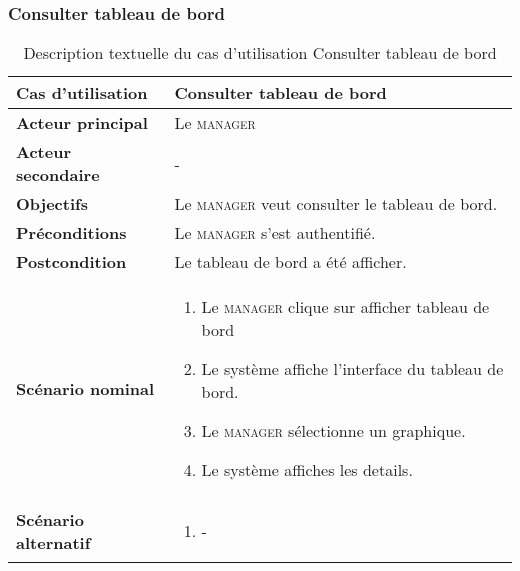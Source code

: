         \subsubsection[Consulter tableau de bord]{Consulter tableau de bord}
        \begin{longtable}{p{4cm} p{9cm}}
            \caption{Description textuelle du cas d’utilisation Consulter tableau de bord}
            \label{table:usecaseConsDash}
            \\\hline\hline
                \textbf{Cas d’utilisation} & \textbf{Consulter tableau de bord}
            \\\hline\hline
                    \textbf{Acteur principal} & Le \textsc{manager}
                \\
                    \textbf{Acteur secondaire} & -
                \\
                    \textbf{Objectifs} & Le \textsc{manager} veut consulter le tableau de bord.
                \\
                    \textbf{Préconditions} & Le \textsc{manager} s’est authentifié.
                \\
                    \textbf{Postcondition} & Le tableau de bord a été afficher.
                \\
                \textbf{Scénario nominal} &
                    \begin{enumerate}[leftmargin=*]
                        \item Le \textsc{manager} clique sur afficher tableau de bord
                        \item Le système affiche l’interface du tableau de bord.
                        \item Le \textsc{manager} sélectionne un graphique.
                        \item Le système affiches les details.
                    \end{enumerate}
                \\
                \textbf{Scénario alternatif} &
                    \begin{enumerate}[leftmargin=*]
                        \item -
                    \end{enumerate}
            \\\bottomrule
        \end{longtable}

